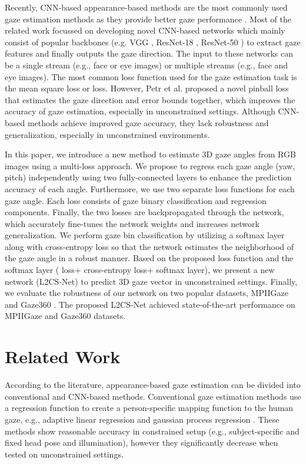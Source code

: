 \documentclass{article}
\begin{document}
Recently, CNN-based appearance-based methods are the most commonly used gaze estimation methods as they provide better gaze performance \cite{cvpr2021,ca-net, dilated,liu2020gaze}. Most of the related work \cite{Gaze360,Mpiigaze,cvpr2021,dilated,ca-net} focussed on developing novel CNN-based networks which mainly consist of popular backbones (e.g. VGG \cite{rtgene}, ResNet-18 \cite{Gaze360}, ResNet-50 \cite{Ethxgaze}) to extract gaze features and finally outputs the gaze direction. The input to these networks can be a single stream \cite{Ethxgaze, Gaze360}(e.g., face or eye images) or multiple streams \cite{cvpr2021} (e.g., face and eye images). The most common loss function used for the gaze estimation task is the mean square loss or  loss. However, Petr et al. \cite{Gaze360} proposed a novel pinball loss that estimates the gaze direction and error bounds together, which improves the accuracy of gaze estimation, especially in unconstrained settings. Although CNN-based methods achieve improved gaze accuracy, they lack robustness and generalization, especially in unconstrained environments.

In this paper, we introduce a new method to estimate 3D gaze angles from RGB images using a multi-loss approach. We propose to regress each gaze angle (yaw, pitch) independently using two fully-connected layers to enhance the prediction accuracy of each angle. Furthermore, we use two separate loss functions for each gaze angle. Each loss consists of gaze binary classification and regression components. Finally, the two losses are backpropagated through the network, which accurately fine-tunes the network weights and increases network generalization. We perform gaze bin classification by utilizing a softmax layer along with cross-entropy loss so that the network estimates the neighborhood of the gaze angle in a robust manner. Based on the proposed loss function and the softmax layer ( loss+ cross-entropy loss+ softmax layer), we present a new network (L2CS-Net) to predict 3D gaze vector in unconstrained settings. Finally, we evaluate the robustness of our network on two popular datasets, MPIIGaze \cite{Mpiigaze} and Gaze360 \cite{Gaze360}. The proposed L2CS-Net achieved state-of-the-art performance on MPIIGaze and Gaze360 datasets.



\section{Related Work}
\label{sec:relatedwork}
According to the literature, appearance-based gaze estimation can be divided into conventional and CNN-based methods. Conventional gaze estimation methods use a regression function to create a person-specific mapping function to the human gaze, e.g., adaptive linear regression \cite{lu2014adaptive} and gaussian process regression \cite{williams2006sparse}. These methods show reasonable accuracy in constrained setup (e.g., subject-specific and fixed head pose and illumination), however they significantly decrease when tested on unconstrained settings. 
\end{document}
